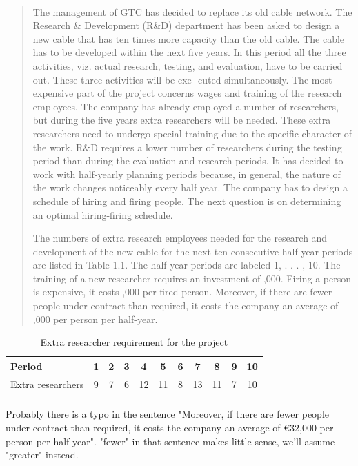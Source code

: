 \paragraph{}
\begin{quote}
The management of GTC has decided to replace its old cable network. The Research \& Development (R\&D) department has been asked to design a new cable that has ten times more capacity than the old cable. The cable has to be developed within the next five years. In this period all the three activities, viz. actual research, testing, and evaluation, have to be carried out. These three activities will be exe- cuted simultaneously. The most expensive part of the project concerns wages and training of the research employees. The company has already employed a number of researchers, but during the five years extra researchers will be needed. These extra researchers need to undergo special training due to the specific character of the work. R\&D requires a lower number of researchers during the testing period than during the evaluation and research periods. It has decided to work with half-yearly planning periods because, in general, the nature of the work changes noticeably every half year. The company has to design a schedule of hiring and firing people. The next question is on determining an optimal hiring-firing schedule.

The numbers of extra research employees needed for the research and development of the new cable for the next ten consecutive half-year periods are listed in Table 1.1. The half-year periods are labeled 1, . . . , 10. The training of a new researcher requires an investment of ,000. Firing a person is expensive, it costs ,000 per fired person. Moreover, if there are fewer people under contract than required, it costs the company an average of ,000 per person per half-year.
\end{quote}

\begin{table}[H]
\centering
\begin{tabular}{lcccccccccc}
\hline
Period & 1 & 2 & 3 & 4 & 5 & 6 & 7 & 8 & 9 & 10 \\ \hline
Extra researchers & 9 & 7 & 6 & 12 & 11 & 8 & 13 & 11 & 7 & 10 \\ \hline
\end{tabular}
\caption{Extra researcher requirement for the project}
\label{extra-researchers}
\end{table}

\paragraph{}
Probably there is a typo in the sentence "Moreover, if there are fewer people under contract than required, it costs the company an average of €32,000 per person per half-year". "fewer" in that sentence makes little sense, we'll assume "greater" instead.

